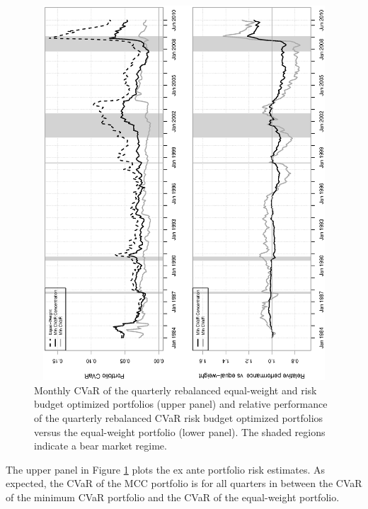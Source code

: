\documentclass[12pt,a4paper]{article}
\begin{document}
\begin{figure}[h]
\begin{center}
\caption{Monthly CVaR of the quarterly rebalanced equal-weight and risk budget optimized portfolios (upper panel) and relative performance of the quarterly rebalanced CVaR risk budget optimized portfolios versus the equal-weight portfolio (lower panel). The shaded regions indicate a bear market regime. \label{fig:relperformance}  }
\includegraphics[width=12cm,height=14cm,angle=270]{portfolioCVaRRelPerf_CC.eps}
\end{center}
\end{figure}


The upper panel in Figure \ref{fig:relperformance} plots the ex ante portfolio risk estimates. As expected, the CVaR of the MCC portfolio is for all quarters in between the CVaR of the minimum CVaR portfolio and the CVaR of the equal-weight portfolio.
\end{document}

